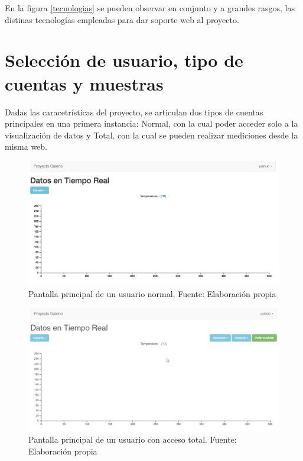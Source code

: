 En la figura \ref{tecnologias} se pueden observar en conjunto y a grandes rasgos, las distinas tecnologías empleadas para dar soporte web al proyecto.

\newpage


\section{Selección de usuario, tipo de cuentas y muestras}

Dadas las caracetrísticas del proyecto, se articulan dos tipos de cuentas principales en una primera instancia: Normal, con la cual poder acceder solo a la visualización de datos y Total, con la cual se pueden realizar mediciones desde la misma web. 

\begin{figure}[H]
	\centering
	\includegraphics[scale=0.3]{figuras/protof/normal.png}
	\caption{Pantalla principal de un usuario normal. Fuente: Elaboración propia}
	\label{normal}
\end{figure}

\begin{figure}[H]
	\centering
	\includegraphics[scale=0.4]{figuras/protof/total.png}
	\caption{Pantalla principal de un usuario con acceso total. Fuente: Elaboración propia}
	\label{total}
\end{figure}

